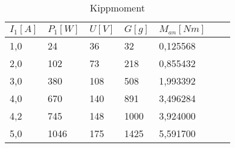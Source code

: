 \begin{table}[htbp]
    \centering
    \begin{tabularx}{\columnwidth}{XXXXXXX}
        \toprule
             $I_1[A]$ &  $P_1[W]$ &  $U[V]$ &  $G[g]$ &  $M_{an}[Nm]$ \\
        \midrule
                1,0 &          24 &        36 &        32 &        0,125568 \\
                2,0 &         102 &        73 &       218 &        0,855432 \\
                3,0 &         380 &       108 &       508 &        1,993392 \\
                4,0 &         670 &       140 &       891 &        3,496284 \\
                4,2 &         745 &       148 &      1000 &        3,924000 \\
                5,0 &        1046 &       175 &      1425 &        5,591700 \\
        \bottomrule
    \end{tabularx}
    \caption{Kippmoment}
\end{table}
